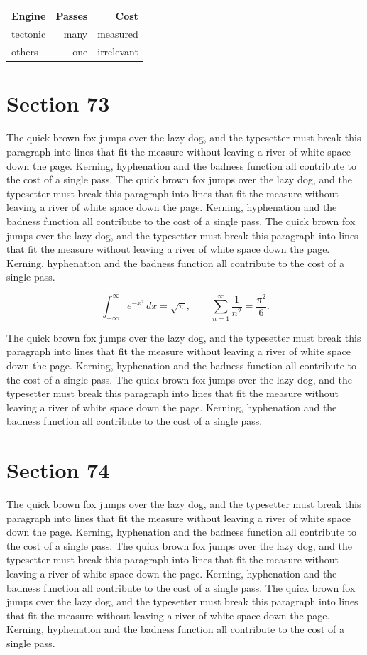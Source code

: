 \documentclass{article}
\begin{document}
\begin{center}
\begin{tabular}{lrr}
\toprule
Engine & Passes & Cost \\
\midrule
tectonic & many & measured \\
others & one & irrelevant \\
\bottomrule
\end{tabular}
\end{center}

\section{Section 73}
The quick brown fox jumps over the lazy dog, and the typesetter must break this paragraph into lines that fit the measure without leaving a river of white space down the page. Kerning, hyphenation and the badness function all contribute to the cost of a single pass. The quick brown fox jumps over the lazy dog, and the typesetter must break this paragraph into lines that fit the measure without leaving a river of white space down the page. Kerning, hyphenation and the badness function all contribute to the cost of a single pass. The quick brown fox jumps over the lazy dog, and the typesetter must break this paragraph into lines that fit the measure without leaving a river of white space down the page. Kerning, hyphenation and the badness function all contribute to the cost of a single pass. 

\begin{equation}
\int_{-\infty}^{\infty} e^{-x^{2}}\,dx = \sqrt{\pi}, \qquad
\sum_{n=1}^{\infty} \frac{1}{n^{2}} = \frac{\pi^{2}}{6}.
\end{equation}

The quick brown fox jumps over the lazy dog, and the typesetter must break this paragraph into lines that fit the measure without leaving a river of white space down the page. Kerning, hyphenation and the badness function all contribute to the cost of a single pass. The quick brown fox jumps over the lazy dog, and the typesetter must break this paragraph into lines that fit the measure without leaving a river of white space down the page. Kerning, hyphenation and the badness function all contribute to the cost of a single pass. 
\section{Section 74}
The quick brown fox jumps over the lazy dog, and the typesetter must break this paragraph into lines that fit the measure without leaving a river of white space down the page. Kerning, hyphenation and the badness function all contribute to the cost of a single pass. The quick brown fox jumps over the lazy dog, and the typesetter must break this paragraph into lines that fit the measure without leaving a river of white space down the page. Kerning, hyphenation and the badness function all contribute to the cost of a single pass. The quick brown fox jumps over the lazy dog, and the typesetter must break this paragraph into lines that fit the measure without leaving a river of white space down the page. Kerning, hyphenation and the badness function all contribute to the cost of a single pass. 
\end{document}
